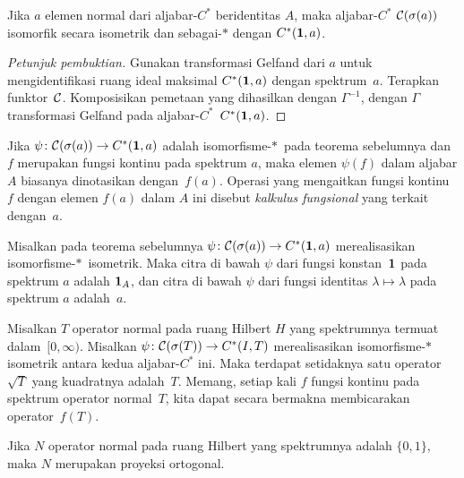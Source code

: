 \begin{thm}\label{00144} Jika $a$ elemen normal dari aljabar-$C^*$
beridentitas $A$, maka aljabar-$C^*$ $\mathcal{C}(\sigma(a))$ isomorfik secara isometrik dan sebagai-$*$
dengan $C^*(\mathbf{1},a)$.
\end{thm}

\begin{proof}[\emph{Petunjuk pembuktian}] Gunakan transformasi Gelfand dari $a$ untuk mengidentifikasi
ruang ideal maksimal $C^*(\mathbf{1},a)$ dengan spektrum~$a$. Terapkan funktor~$\mathcal{C}$.
Komposisikan pemetaan yang dihasilkan dengan $\Gamma^{-1}$, dengan $\Gamma$ transformasi Gelfand pada
aljabar-$C^*$~$C^*(\mathbf{1},a)$.   \ns
\end{proof}

Jika $\psi\colon \mathcal{C}(\sigma(a)) \rightarrow C^*(\mathbf{1},a)$ adalah isomorfisme-$*\,$ pada teorema sebelumnya dan $f$
merupakan fungsi kontinu pada spektrum $a$, maka elemen $\psi(f)$ dalam aljabar $A$ biasanya dinotasikan
dengan~$f(a)$. Operasi yang mengaitkan fungsi kontinu $f$ dengan elemen $f(a)$ dalam $A$ ini disebut
\emph{kalkulus fungsional} yang terkait dengan~$a$.

\begin{exam} Misalkan pada teorema sebelumnya $\psi\colon \mathcal{C}(\sigma(a)) \rightarrow
C^*(\mathbf{1},a)$ merealisasikan isomorfisme-$*\,$ isometrik. Maka citra di bawah $\psi$ dari fungsi konstan~$\mathbf{1}$
pada spektrum $a$ adalah $\mathbf{1}_A$, dan citra di bawah $\psi$ dari fungsi identitas $\lambda \mapsto \lambda$
pada spektrum $a$ adalah~$a$.
\end{exam}

\begin{exam}\label{X_sqroot_op} Misalkan $T$ operator normal pada ruang Hilbert $H$ yang spektrumnya termuat
dalam~$[0,\infty)$. Misalkan $\psi\colon \mathcal{C}(\sigma(T)) \rightarrow C^*(I,T)$ merealisasikan isomorfisme-$*\,$
isometrik antara kedua aljabar-$C^*$ ini. Maka terdapat setidaknya satu operator $\sqrt T$ yang kuadratnya
adalah~$T$. Memang, setiap kali $f$ fungsi kontinu pada spektrum operator normal~$T$, kita dapat secara bermakna
membicarakan operator~$f(T)$.
\end{exam}

\begin{exam} Jika $N$ operator normal pada ruang Hilbert yang spektrumnya adalah $\{0,1\}$, maka
$N$ merupakan proyeksi ortogonal.
\end{exam}

